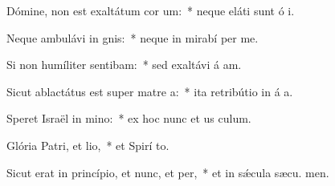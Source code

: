\item Dómine, non est exaltátum cor um:~* neque eláti sunt ó i.
\item Neque ambulávi in gnis:~* neque in mirabí per me.
\item Si non humíliter sentibam:~* sed exaltávi á am.
\item Sicut ablactátus est super matre a:~* ita retribútio in á a.
\item Speret Israël in mino:~* ex hoc nunc et us  culum.
\item Glória Patri, et lio,~* et Spirí to.
\item Sicut erat in princípio, et nunc, et per,~* et in sǽcula sæcu. men.
